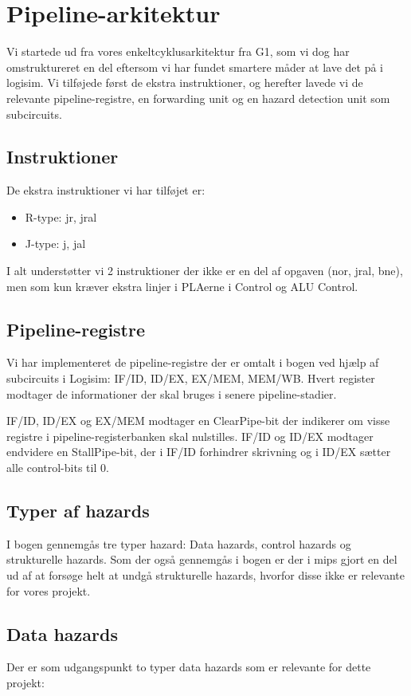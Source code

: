 \section{Pipeline-arkitektur}

Vi startede ud fra vores enkeltcyklusarkitektur fra G1, som vi dog har omstruktureret en del
eftersom vi har fundet smartere måder at lave det på i logisim. Vi tilføjede først de ekstra
instruktioner, og herefter lavede vi de relevante pipeline-registre, en forwarding unit og 
en hazard detection unit som subcircuits.  

\subsection{Instruktioner}
De ekstra instruktioner vi har tilføjet er:
\begin{itemize}
\item R-type: jr, jral
\item J-type: j, jal
\end{itemize}

I alt understøtter vi 2 instruktioner der ikke er en del af opgaven (nor, jral, bne), men som kun kræver ekstra
linjer i PLAerne i Control og ALU Control. 

\subsection{Pipeline-registre}

Vi har implementeret de pipeline-registre der er omtalt i bogen ved hjælp af
subcircuits i Logisim: IF/ID, ID/EX, EX/MEM, MEM/WB. Hvert register modtager
de informationer der skal bruges i senere pipeline-stadier.

IF/ID, ID/EX og EX/MEM modtager en ClearPipe-bit der indikerer om visse
registre i pipeline-registerbanken skal nulstilles. IF/ID og ID/EX modtager
endvidere en StallPipe-bit, der i IF/ID forhindrer skrivning og i ID/EX sætter
alle control-bits til 0.

\subsection{Typer af hazards}
I bogen gennemgås tre typer hazard: Data hazards, control hazards og
strukturelle hazards. Som der også gennemgås i bogen er der i mips gjort en del
ud af at forsøge helt at undgå strukturelle hazards, hvorfor disse ikke er
relevante for vores projekt.

\subsection{Data hazards}
Der er som udgangspunkt to typer data hazards som er relevante for dette projekt:

